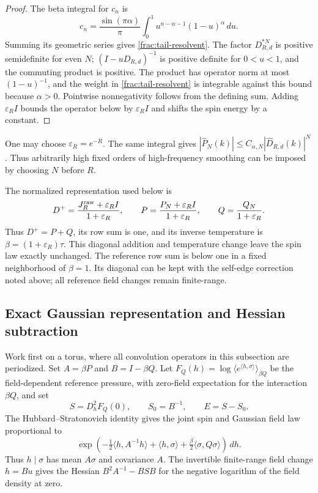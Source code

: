\documentclass[11pt]{article}
\begin{document}
\begin{proof}
The beta integral for \(c_n\) is
\[
 c_n=\frac{\sin(\pi\alpha)}\pi
       \int_0^1u^{n-\alpha-1}(1-u)^\alpha\,du.
\]
Summing its geometric series gives \eqref{frac:tail-resolvent}.
The factor \(D_{R,d}^{*N}\) is positive semidefinite for even
\(N\); \((I-uD_{R,d})^{-1}\) is positive definite for
\(0<u<1\), and the commuting product is positive. The product has operator norm at most \((1-u)^{-1}\), and
the weight in \eqref{frac:tail-resolvent} is integrable against
this bound because \(\alpha>0\). Pointwise nonnegativity follows
from the defining sum. Adding \(\varepsilon_R I\) bounds the
operator below by \(\varepsilon_R I\) and shifts the spin energy
by a constant.
\end{proof}

One may choose \(\varepsilon_R=e^{-R}\). The same integral gives
\(|\widehat P_N(k)|\le C_{\alpha,N}|\widehat D_{R,d}(k)|^N\).
Thus arbitrarily high fixed orders of high-frequency smoothing
can be imposed by choosing \(N\) before \(R\). 

The normalized representation used below is
\[
 D^+=\frac{J_R^{\rm raw}+\varepsilon_R I}{1+\varepsilon_R},
 \qquad P=\frac{P_N+\varepsilon_R I}{1+\varepsilon_R},
 \qquad Q=\frac{Q_N}{1+\varepsilon_R}.
\]
Thus \(D^+=P+Q\), its row sum is one, and its inverse temperature
is \(\beta=(1+\varepsilon_R)\tau\). This diagonal addition and
temperature change leave the spin law exactly unchanged.
The reference row sum is below one in a fixed neighborhood of
\(\beta=1\). Its diagonal can be kept with the self-edge correction
noted above; all reference field changes remain finite-range.

\subsection{Exact Gaussian representation and Hessian subtraction}
\label{frac:representation}
Work first on a torus, where all convolution operators in this
subsection are periodized. Set \(A=\beta P\) and \(B=I-\beta Q\).
Let \(F_Q(h)=\log\langle e^{\langle h,\sigma\rangle}\rangle_{\beta Q}\)
be the field-dependent reference pressure, with zero-field expectation
for the interaction \(\beta Q\), and set
\[
 S=D_h^2F_Q(0),\qquad S_0=B^{-1},\qquad E=S-S_0.
\]
The Hubbard--Stratonovich identity gives the joint spin and Gaussian
field law proportional to
\[
 \exp\!\left(-\tfrac12\langle h,A^{-1}h\rangle
       +\langle h,\sigma\rangle
       +\tfrac\beta2\langle\sigma,Q\sigma\rangle\right)\,dh .
\]
Thus \(h\mid\sigma\) has mean \(A\sigma\) and covariance \(A\).
The invertible finite-range field change \(h=Bu\) gives the
Hessian \(B^2 A^{-1}-BSB\) for the negative logarithm of the
field density at zero.
\end{document}
